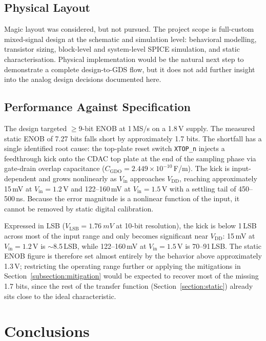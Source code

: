 \documentclass[12pt, a4paper]{article}
\begin{document}
\subsection{Physical Layout}

Magic layout was considered, but not pursued. The project scope is full-custom mixed-signal design at the schematic and simulation level: behavioral modelling, transistor sizing, block-level and system-level SPICE simulation, and static characterisation. Physical implementation would be the natural next step to demonstrate a complete design-to-GDS flow, but it does not add further insight into the analog design decisions documented here.

\subsection{Performance Against Specification}

The design targeted $\geq$9-bit ENOB at 1\,MS/s on a 1.8\,V supply. The measured static ENOB of 7.27 bits falls short by approximately 1.7 bits. The shortfall has a single identified root cause: the top-plate reset switch \texttt{XTOP\_n} injects a feedthrough kick onto the CDAC top plate at the end of the sampling phase via gate-drain overlap capacitance ($C_\mathrm{GDO} = 2.449 \times 10^{-10}$\,F/m). The kick is input-dependent and grows nonlinearly as $V_\mathrm{in}$ approaches $V_\mathrm{DD}$, reaching approximately 15\,mV at $V_\mathrm{in} = 1.2$\,V and 122--160\,mV at $V_\mathrm{in} = 1.5$\,V with a settling tail of 450--500\,ns. Because the error magnitude is a nonlinear function of the input, it cannot be removed by static digital calibration.

Expressed in LSB ($V_\mathrm{LSB} = \qty{1.76}{mV}$ at 10-bit resolution), the kick is below 1\,LSB across most of the input range and only becomes significant near $V_\mathrm{DD}$: 15\,mV at $V_\mathrm{in}=1.2$\,V is $\sim$8.5\,LSB, while 122--160\,mV at $V_\mathrm{in}=1.5$\,V is 70--91\,LSB. The static ENOB figure is therefore set almost entirely by the behavior above approximately 1.3\,V; restricting the operating range further or applying the mitigations in Section~\ref{subsection:mitigation} would be expected to recover most of the missing 1.7 bits, since the rest of the transfer function (Section~\ref{section:static}) already sits close to the ideal characteristic.

\section{Conclusions}
\label{section:conclusions}
\end{document}
